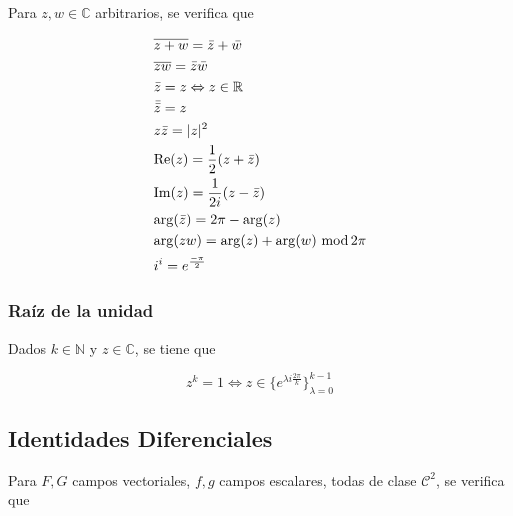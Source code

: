 Para $z,w\in\mathbb{C}$ arbitrarios, se verifica que
\newline
\begin{minipage}{0.5\textwidth}
\begin{equation}
\begin{split}
    &\overline{z+w}=\Bar{z}+\Bar{w}\\
    &\overline{zw}=\Bar{z}\Bar{w}\\
    &\Bar{z}=z\Leftrightarrow z\in\mathbb{R}\\
    &\Bar{\Bar{z}}=z\\
    &z\Bar{z}=|z|^2\\
    &\mathrm{Re}(z)=\frac{1}{2}(z+\Bar{z})\\
    &\mathrm{Im}(z)=\frac{1}{2i}(z-\Bar{z})\\
    &\mathrm{arg}(\Bar{z}) = 2\pi-\mathrm{arg}(z)\\
    &\mathrm{arg}(zw)=\mathrm{arg}(z)+\mathrm{arg}(w)\,\,
    \mathrm{mod}\,2\pi\\
    &i^i=e^{\frac{-\pi}{2}}
\end{split}
\nonumber
\end{equation}
\end{minipage}

\subsubsection{Raíz de la unidad}

Dados $k\in\mathbb{N}$ y $z \in \mathbb{C}$, se tiene que

\[z^k=1\Leftrightarrow z\in\{e^{\lambda i\frac{2\pi}{k}}\}^{k-1}_{\lambda=0}\]

\newpage
\subsection{Identidades Diferenciales}

Para $F,G$ campos vectoriales, $f,g$ campos escalares, todas de clase $\mathcal{C}^2$, se verifica que

